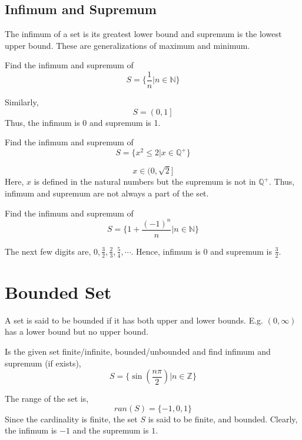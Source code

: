 	\subsection{Infimum and Supremum}
	The infimum of a set is its greatest lower bound and supremum is the lowest upper bound. These are generalizations of maximum and minimum.
	\begin{eg}
		Find the infimum and supremum of
		\[S=\{\frac{1}{n} | n \in \mathbb{N}\}\]
	\end{eg} 
	\begin{explanation}
		Similarly,
		\[S=\left( 0, 1 \right] \]
		Thus, the infimum is 0 and supremum is 1.
	\end{explanation}
	\begin{eg}
		Find the infimum and supremum of
		\[S=\{ x^2\leq 2 | x\in \mathbb{Q}^+ \}\]
	\end{eg}
	\begin{explanation}
		\[x\in (0, \sqrt{2} ]\]
		Here, $x$ is defined in the natural numbers but the supremum is not in $\mathbb{Q}^+$. Thus, infimum and supremum are not always a part of the set.
	\end{explanation}
	\begin{eg}
		Find the infimum and supremum of
		\[S=\{1+\frac{(-1)^n}{n} | n\in \mathbb{N}\}\]
	\end{eg}
	\begin{explanation}
		The next few digits are, $0, \frac{3}{2}, \frac{2}{3}, \frac{5}{4}, \cdots$. Hence, infimum is 0 and supremum is $\frac{3}{2}$.
	\end{explanation}
	\section{Bounded Set}
	A set is said to be bounded if it has both upper and lower bounds. E.g. $(0, \infty)$ has a lower bound but no upper bound.
	\begin{eg}[Finite]
		Is the given set finite/infinite, bounded/unbounded and find infimum and supremum (if exists),
		\[S= \{ \sin(\frac{n\pi}{2}) | n\in \mathbb{Z} \}\]
	\end{eg}
	\begin{explanation}
		The range of the set is,
		\[ran(S)=\{-1,0,1\}\]
		Since the cardinality is finite, the set $S$ is said to be finite, and bounded. Clearly, the infimum is $-1$ and the supremum is $1$.
	\end{explanation}
